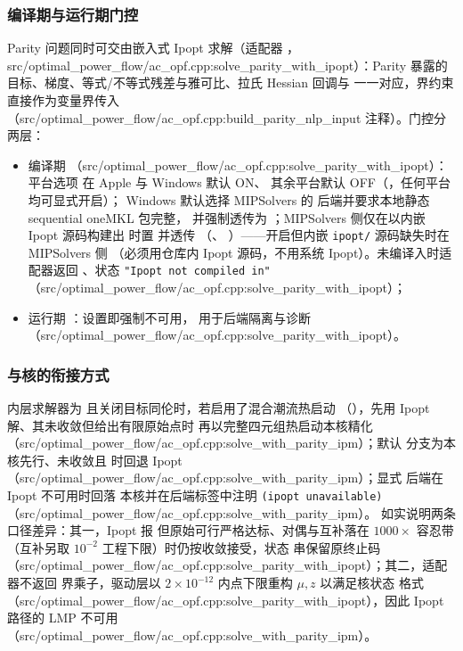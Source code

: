 \subsubsection*{编译期与运行期门控}
Parity 问题同时可交由嵌入式 Ipopt 求解（适配器
，src/optimal\_power\_flow/ac\_opf.cpp:solve\_parity\_with\_ipopt）：Parity
 暴露的目标、梯度、等式/不等式残差与雅可比、拉氏 Hessian
回调与  一一对应，界约束直接作为变量界传入
（src/optimal\_power\_flow/ac\_opf.cpp:build\_parity\_nlp\_input 注释）。门控分两层：
\begin{itemize}
  \item 编译期 （src/optimal\_power\_flow/ac\_opf.cpp:solve\_parity\_with\_ipopt）：
        平台选项  在 Apple 与 Windows 默认 ON、
        其余平台默认 OFF（，任何平台均可显式开启）；
        Windows 默认选择 MIPSolvers 的  后端并要求本地静态
        sequential oneMKL 包完整，
        并强制透传为 ；MIPSolvers 侧仅在以内嵌
        Ipopt 源码构建出  时置  并透传
        （、
        ）——开启但内嵌
        \texttt{ipopt/} 源码缺失时在 MIPSolvers 侧 （必须用仓库内
        Ipopt 源码，不用系统 Ipopt）。未编译入时适配器返回
        、状态 \texttt{"Ipopt not compiled in"}
        （src/optimal\_power\_flow/ac\_opf.cpp:solve\_parity\_with\_ipopt）；
  \item 运行期 ：设置即强制不可用，
        用于后端隔离与诊断（src/optimal\_power\_flow/ac\_opf.cpp:solve\_parity\_with\_ipopt）。
\end{itemize}

\subsubsection*{与核的衔接方式}
内层求解器为  且关闭目标同伦时，若启用了混合潮流热启动
（），先用 Ipopt 解、其未收敛但给出有限原始点时
再以完整四元组热启动本核精化（src/optimal\_power\_flow/ac\_opf.cpp:solve\_with\_parity\_ipm）；默认 
分支为本核先行、未收敛且  时回退 Ipopt
（src/optimal\_power\_flow/ac\_opf.cpp:solve\_with\_parity\_ipm）；显式  后端在 Ipopt 不可用时回落
本核并在后端标签中注明 \texttt{(ipopt unavailable)}（src/optimal\_power\_flow/ac\_opf.cpp:solve\_with\_parity\_ipm）。
如实说明两条口径差异：其一，Ipopt 报
 但原始可行严格达标、对偶与互补落在
$1000\times$ 容忍带（互补另取 $10^{-2}$ 工程下限）时仍按收敛接受，状态
串保留原终止码（src/optimal\_power\_flow/ac\_opf.cpp:solve\_parity\_with\_ipopt）；其二，适配器不返回
界乘子，驱动层以 $2\times10^{-12}$ 内点下限重构 $\mu,z$ 以满足核状态
格式（src/optimal\_power\_flow/ac\_opf.cpp:solve\_parity\_with\_ipopt），因此 Ipopt 路径的 LMP 不可用
（src/optimal\_power\_flow/ac\_opf.cpp:solve\_with\_parity\_ipm）。

